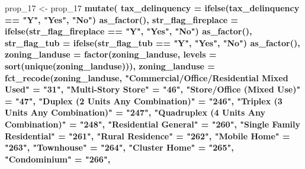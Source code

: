 \documentclass[]{book}
\newenvironment{Shaded}{\begin{snugshade}}{\end{snugshade}}
\newcommand{\KeywordTok}[1]{\textcolor[rgb]{0.13,0.29,0.53}{\textbf{#1}}}
\newcommand{\DataTypeTok}[1]{\textcolor[rgb]{0.13,0.29,0.53}{#1}}
\newcommand{\DecValTok}[1]{\textcolor[rgb]{0.00,0.00,0.81}{#1}}
\newcommand{\StringTok}[1]{\textcolor[rgb]{0.31,0.60,0.02}{#1}}
\newcommand{\OperatorTok}[1]{\textcolor[rgb]{0.81,0.36,0.00}{\textbf{#1}}}
\newcommand{\NormalTok}[1]{#1}
\theoremstyle{definition}
\theoremstyle{definition}
\theoremstyle{definition}
\theoremstyle{remark}
\begin{document}
\begin{Shaded}
\begin{Highlighting}[]
{{{{\NormalTok{prop_}\DecValTok{17}\NormalTok{ <-}\StringTok{ }\NormalTok{prop_}\DecValTok{17} \OperatorTok{%>%}
\StringTok{  }\KeywordTok{mutate}\NormalTok{(}
    \DataTypeTok{tax_delinquency =} \KeywordTok{ifelse}\NormalTok{(tax_delinquency }\OperatorTok{==}\StringTok{ "Y"}\NormalTok{, }\StringTok{"Yes"}\NormalTok{, }\StringTok{"No"}\NormalTok{) }\OperatorTok{%>%}
\StringTok{      }\KeywordTok{as_factor}\NormalTok{(),}
    \DataTypeTok{str_flag_fireplace =} \KeywordTok{ifelse}\NormalTok{(str_flag_fireplace }\OperatorTok{==}\StringTok{ "Y"}\NormalTok{, }\StringTok{"Yes"}\NormalTok{, }\StringTok{"No"}\NormalTok{) }\OperatorTok{%>%}
\StringTok{      }\KeywordTok{as_factor}\NormalTok{(),}
    \DataTypeTok{str_flag_tub =} \KeywordTok{ifelse}\NormalTok{(str_flag_tub }\OperatorTok{==}\StringTok{ "Y"}\NormalTok{, }\StringTok{"Yes"}\NormalTok{, }\StringTok{"No"}\NormalTok{) }\OperatorTok{%>%}
\StringTok{      }\KeywordTok{as_factor}\NormalTok{(),}
    \DataTypeTok{zoning_landuse =} \KeywordTok{factor}\NormalTok{(zoning_landuse, }\DataTypeTok{levels =} \KeywordTok{sort}\NormalTok{(}\KeywordTok{unique}\NormalTok{(zoning_landuse))),}
    \DataTypeTok{zoning_landuse =} \KeywordTok{fct_recode}\NormalTok{(zoning_landuse,}
      \StringTok{"Commercial/Office/Residential Mixed Used"}\NormalTok{ =}\StringTok{ "31"}\NormalTok{, }
      \StringTok{"Multi-Story Store"}\NormalTok{                        =}\StringTok{ "46"}\NormalTok{,}
      \StringTok{"Store/Office (Mixed Use)"}\NormalTok{                 =}\StringTok{ "47"}\NormalTok{,}
      \StringTok{"Duplex (2 Units Any Combination)"}\NormalTok{         =}\StringTok{ "246"}\NormalTok{,}
      \StringTok{"Triplex (3 Units Any Combination)"}\NormalTok{        =}\StringTok{ "247"}\NormalTok{,}
      \StringTok{"Quadruplex (4 Units Any Combination)"}\NormalTok{     =}\StringTok{ "248"}\NormalTok{,}
      \StringTok{"Residential General"}\NormalTok{                      =}\StringTok{ "260"}\NormalTok{,}
      \StringTok{"Single Family Residential"}\NormalTok{                =}\StringTok{ "261"}\NormalTok{,}
      \StringTok{"Rural Residence"}\NormalTok{                          =}\StringTok{ "262"}\NormalTok{,}
      \StringTok{"Mobile Home"}\NormalTok{                              =}\StringTok{ "263"}\NormalTok{,}
      \StringTok{"Townhouse"}\NormalTok{                                =}\StringTok{ "264"}\NormalTok{,}
      \StringTok{"Cluster Home"}\NormalTok{                             =}\StringTok{ "265"}\NormalTok{,}
      \StringTok{"Condominium"}\NormalTok{                              =}\StringTok{ "266"}\NormalTok{,}
}}}}}}}}
\end{Highlighting}
\end{Shaded}
\end{document}
